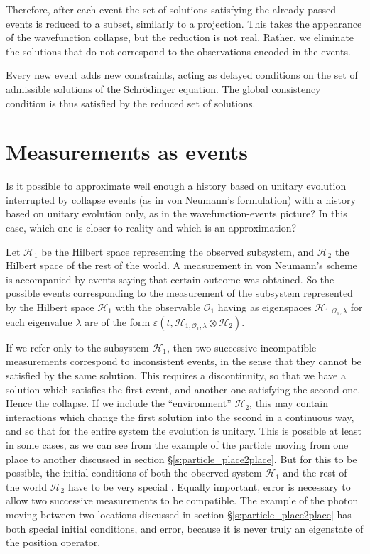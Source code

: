 \documentclass[12pt]{amsart}
\theoremstyle{definition}
\theoremstyle{plain}
\begin{document}
Therefore, after each event the set of solutions satisfying the already passed events is reduced to a subset, similarly to a projection. This takes the appearance of the wavefunction collapse, but the reduction is not real. Rather, we eliminate the solutions that do not correspond to the observations encoded in the events.

Every new event adds new constraints, acting as delayed conditions on the set of admissible solutions of the Schr\"odinger equation.
The global consistency condition is thus satisfied by the reduced set of solutions.


\section{Measurements as events}
\label{s:measurements-as-events}

Is it possible to approximate well enough a history based on unitary evolution interrupted by collapse events (as in von Neumann's formulation) with a history based on unitary evolution only, as in the wavefunction-events picture? In this case, which one is closer to reality and which is an approximation?

Let $\mathcal{H}_1$ be the Hilbert space representing the observed subsystem, and $\mathcal{H}_2$ the Hilbert space of the rest of the world.
A measurement in von Neumann's scheme is accompanied by events saying that certain outcome was obtained. So the possible events corresponding to the measurement of the subsystem represented by the Hilbert space $\mathcal{H}_1$ with the observable $\mathcal O_1$ having as eigenspaces $\mathcal{H}_{1,\mathcal O_1,\lambda}$ for each eigenvalue $\lambda$ are of the form $\varepsilon(t,\mathcal{H}_{1,\mathcal O_1,\lambda}\otimes\mathcal{H}_{2})$.

If we refer only to the subsystem $\mathcal{H}_1$, then two successive incompatible measurements correspond to inconsistent events, in the sense that they cannot be satisfied by the same solution. This requires a discontinuity, so that we have a solution which satisfies the first event, and another one satisfying the second one. Hence the collapse. If we include the ``environment'' $\mathcal{H}_2$, this may contain interactions which change the first solution into the second in a continuous way, and so that for the entire system the evolution is unitary.
This is possible at least in some cases, as we can see from the example of the particle moving from one place to another discussed in section \S\ref{s:particle_place2place}.
But for this to be possible, the initial conditions of both the observed system $\mathcal{H}_1$ and the rest of the world $\mathcal{H}_2$ have to be very special \cite{Sto12QMb}.
Equally important, error is necessary to allow two successive measurements to be compatible.
The example of the photon moving between two locations discussed in section \S\ref{s:particle_place2place} has both special initial conditions, and error, because it is never truly an eigenstate of the position operator.
\end{document}
